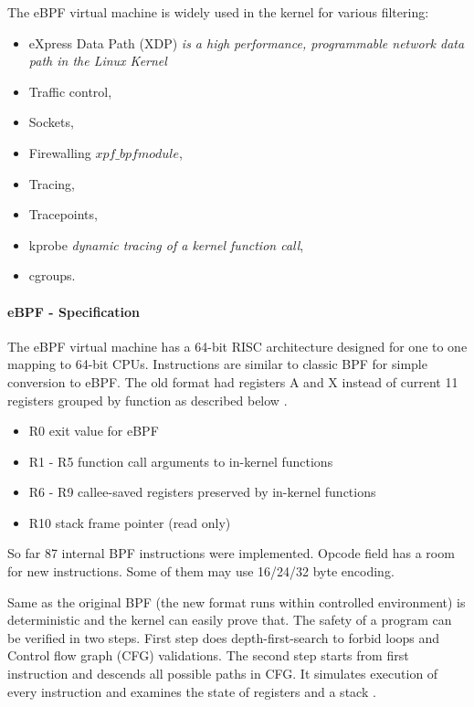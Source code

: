 The eBPF virtual machine is widely used in the kernel for various filtering:
\begin{itemize}
	\item eXpress Data Path (XDP) \textit{is a high performance, programmable network data path in the Linux Kernel}
    \item Traffic control,
    \item Sockets,
    \item Firewalling \textit{\(xpf\_bpf module\)},
    \item Tracing,
    \item Tracepoints,
    \item kprobe \textit{dynamic tracing of a kernel function call},
    \item cgroups.
\end{itemize}

\paragraph{eBPF - Specification}
The eBPF virtual machine has a 64-bit RISC architecture designed for one to one mapping to 64-bit CPUs.
Instructions are similar to classic BPF for simple conversion to eBPF.
The old format had registers A and X instead of current 11 registers grouped by function as described below \cite{kernel_bpf_specification}.
\pagebreak
\begin{itemize}
	\item R0 exit value for eBPF
	\item R1 - R5 function call arguments to in-kernel functions
	\item R6 - R9 callee-saved registers preserved by in-kernel functions
	\item R10 stack frame pointer (read only)
\end{itemize}

So far 87 internal BPF instructions were implemented.
Opcode field has a room for new instructions.
Some of them may use 16/24/32 byte encoding.

Same as the original BPF (the new format runs within controlled environment) is deterministic and the kernel can easily prove that.
The safety of a program can be verified in two steps.
First step does depth-first-search to forbid  loops and Control flow graph (CFG) validations.
The second step starts from first instruction and descends all possible paths in CFG. It simulates execution of every instruction and examines the state of registers and a stack \cite{kernel_bpf_specification}.

